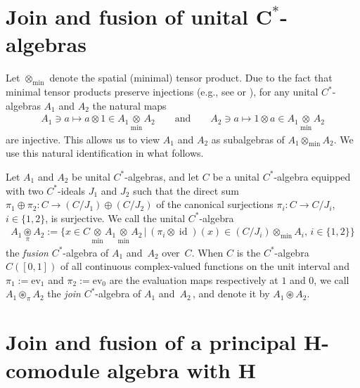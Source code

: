 \documentclass[11pt]{article}
\numberwithin{equation}{section}
\begin{document}
\section[Join and fusion of unital $C^*$-algebras]{Join and fusion of unital $\boldsymbol{C^*}$-algebras}


Let $\otimes_{\min}$ denote the spatial (minimal) tensor product.
Due to the fact that minimal tensor products preserve injections
 (e.g., see \cite[Proposition~4.22]{t-m79} or
\cite[Section~1.3]{w-s94}),
for any unital $C^*$-algebras $A_1$ and $A_2$ the natural maps
\begin{gather*}
A_1\ni a\longmapsto a\otimes 1\in A_1 \underset{\min}{\otimes} A_2\qquad \text{and}
\qquad  A_2\ni a\longmapsto 1\otimes a\in A_1 \underset{\min}{\otimes} A_2
\end{gather*}
are injective. This allows us to view $A_1$ and $A_2$ as subalgebras of
$A_1 \otimes_{\min} A_2$. We use this natural identif\/ication in what follows.
\begin{Definition}\label{gjoin}
Let $A_1$ and $A_2$  be unital $C^*$-algebras, and
let $C$ be a unital $C^*$-algebra equipped with two $C^*$-ideals $J_1$ and $ J_2$
such that the direct sum
$
\pi_1\oplus\pi_2\colon C\rightarrow (C/J_1) \oplus (C/J_2)
$
of the canonical surjections $\pi_i\colon C\to C/J_i$, $i\in \{1,2\}$, is surjective.
We call the unital $C^*$-algebra
\begin{gather*}
A_1 \underset{\pi}{\circledast} A_2 :=
\big\{x\in C \underset{\min}{\otimes} A_1 \underset{\min}{\otimes} A_2 \,
\big|\,
(\pi_i\otimes \operatorname{id})(x) \in
(C/J_i)\otimes_{\min}A_i
, \, i\in\{1,2\}
\big\}
\end{gather*}
the \emph{fusion} $C^*$-algebra of $A_1$ and~$A_2$ over~$C$.
When $C$ is the $C^*$-algebra $C([0,1])$ of all continuous complex-valued
functions on the unit interval and
$\pi_1:=\mathrm{ev}_1$ and $\pi_2:=\mathrm{ev}_0$ are
the evaluation maps respectively at $1$ and $0$,
we call $A_1 \circledast_\pi A_2$ the \emph{join} $C^*$-algebra of $A_1$ and~$A_2\,$, and denote it by
 $A_1 \circledast A_2$.
\end{Definition}
\setcounter{section}{4}
\setcounter{subsection}{0}
\setcounter{subsubsection}{0}
\setcounter{Theorem}{1}
\setcounter{equation}{0}
\section[Join and fusion of a principal $H$-comodule algebra with $H$]{Join and fusion of a principal $\boldsymbol{H}$-comodule algebra with $\boldsymbol{H}$}
\end{document}
